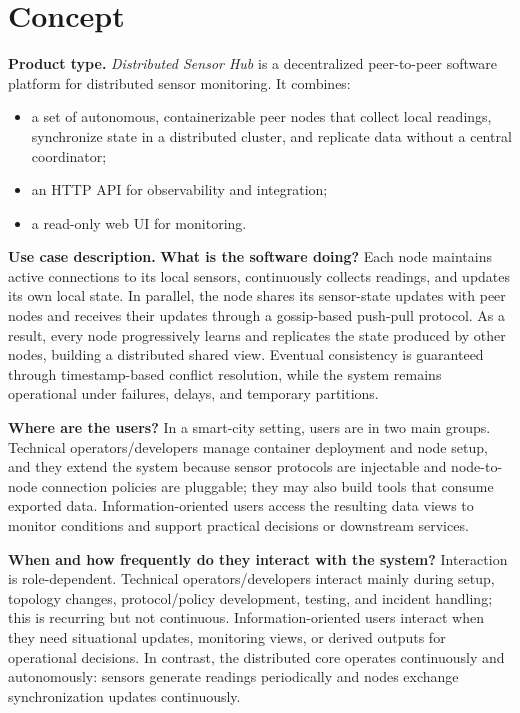 \section{Concept}\label{concept}

\textbf{Product type.}
\textit{Distributed Sensor Hub} is a decentralized peer-to-peer software platform for distributed sensor monitoring. It combines:
\begin{itemize}
  \item a set of autonomous, containerizable peer nodes that collect local readings, synchronize state in a distributed cluster, and replicate data without a central coordinator;
  \item an HTTP API for observability and integration;
  \item a read-only web UI for monitoring.
\end{itemize}


\textbf{Use case description.}
\textbf{What is the software doing?}
Each node maintains active connections to its local sensors, continuously collects readings, and updates its own local state. In parallel, the node shares its sensor-state updates with peer nodes and receives their updates through a gossip-based push-pull protocol. As a result, every node progressively learns and replicates the state produced by other nodes, building a distributed shared view. Eventual consistency is guaranteed through timestamp-based conflict resolution, while the system remains operational under failures, delays, and temporary partitions.

\textbf{Where are the users?}
In a smart-city setting, users are in two main groups. Technical operators/developers manage container deployment and node setup, and they extend the system because sensor protocols are injectable and node-to-node connection policies are pluggable; they may also build tools that consume exported data. Information-oriented users access the resulting data views to monitor conditions and support practical decisions or downstream services.

\textbf{When and how frequently do they interact with the system?}
Interaction is role-dependent. Technical operators/developers interact mainly during setup, topology changes, protocol/policy development, testing, and incident handling; this is recurring but not continuous. Information-oriented users interact when they need situational updates, monitoring views, or derived outputs for operational decisions. In contrast, the distributed core operates continuously and autonomously: sensors generate readings periodically and nodes exchange synchronization updates continuously.

